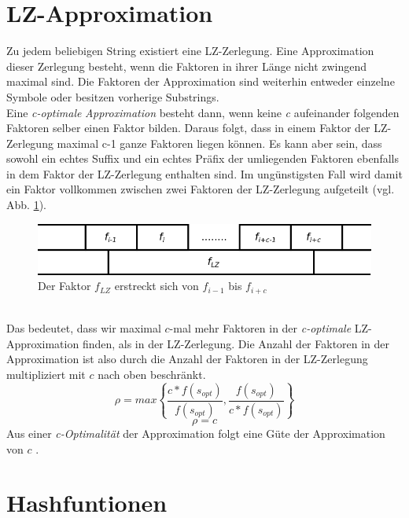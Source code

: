 \section{LZ-Approximation}
Zu jedem beliebigen String  existiert eine LZ-Zerlegung. Eine Approximation dieser Zerlegung besteht, wenn die Faktoren in ihrer Länge nicht zwingend maximal sind. Die Faktoren der Approximation sind weiterhin entweder einzelne Symbole oder besitzen vorherige Substrings.\\
Eine \textit{c-optimale} \emph{Approximation} besteht dann, wenn keine \textit{c} aufeinander folgenden Faktoren selber einen Faktor bilden. 
Daraus folgt, dass in einem Faktor der LZ-Zerlegung maximal c-1 ganze Faktoren liegen können. Es kann aber sein, dass sowohl ein echtes Suffix und ein echtes Präfix der umliegenden Faktoren ebenfalls in dem Faktor der LZ-Zerlegung enthalten sind. Im ungünstigsten Fall wird damit ein Faktor vollkommen zwischen zwei Faktoren der LZ-Zerlegung aufgeteilt (vgl. Abb. \ref{flz}). 
%
\begin{figure}[h]
	\includegraphics[width=\textwidth,keepaspectratio]{faktorenmerge}
	\caption{Der Faktor $f_{LZ}$ erstreckt sich von $f_{i-1}$ bis $f_{i+c}$}
	\label{flz}
\end{figure}\\
Das bedeutet, dass wir maximal $c$-mal mehr Faktoren in der \textit{c-optimale} LZ-Approximation finden, als in der  LZ-Zerlegung.
Die Anzahl der Faktoren in der Approximation ist also durch die Anzahl der Faktoren in der LZ-Zerlegung multipliziert mit $c$ nach oben beschränkt.  
\begin{equation}
\rho = max
\left\{
\frac{c*f(s_{opt})}{f(s_{opt})},\frac{f(s_{opt})}{c * f(s_{opt})}
\right\}
\end{equation}
\begin{equation}
\rho = c
\end{equation}
Aus einer \textit{c-Optimalität} der Approximation folgt eine Güte der Approximation von $c$ \cite{LZ77Approx}.
%
%
%
\newpage
%
%
%
\section{Hashfuntionen}

